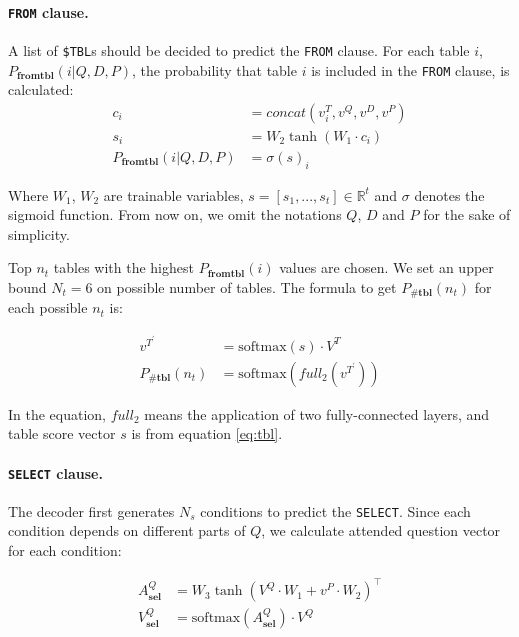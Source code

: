 \documentclass[11pt,a4paper]{article}
\begin{document}
\paragraph{\texttt{FROM} clause.} A list of \texttt{\$TBL}s should be decided to predict the \texttt{FROM} clause. For each table $i$, $P_\textbf{fromtbl}(i | Q,D,P)$, the probability that table $i$ is included in the \texttt{FROM} clause, is calculated:
\begin{align}
c_i &= concat( v^T_i, v^Q, v^D, v^P ) \nonumber \\  
s_i &= W_2 \tanh( W_1 \cdot c_i )  \label{eq:tbl}  \\
P_\textbf{fromtbl}(i|Q,D,P) &=  \sigma ( s )_i \nonumber
\end{align} 

Where $W_1$, $W_2$ are trainable variables, $s=[s_1, ..., s_t] \in \mathbb{R}^t$ and $\sigma$ denotes the sigmoid function. From now on, we omit the notations $Q$, $D$ and $P$ for the sake of simplicity.

Top $n_t$ tables with the highest $P_\textbf{fromtbl}(i)$ values are chosen. We set an upper bound $N_t=6$ on possible number of tables. The formula to get $P_\textbf{\#tbl}(n_t)$ for each possible $n_t$ is:

\begin{equation}
\begin{aligned}
v^{T^\prime} &= \text{softmax}(s) \cdot V^T \\
P_\textbf{\#tbl}(n_t) &= \text{softmax}(full_2(v^{T^\prime}) )
\end{aligned}
\end{equation}

In the equation, $full_2$ means the application of two fully-connected layers, and table score vector $s$ is from equation \ref{eq:tbl}.

\paragraph{\texttt{SELECT} clause.}  The decoder first generates $N_s$ conditions to predict the \texttt{SELECT}. Since each condition depends on different parts of $Q$, we calculate attended question vector for each condition:

\begin{equation}
\begin{aligned}
A^Q_\textbf{sel}&=W_3\tanh(V^Q \cdot W_1 + v^P \cdot W_2 )^\intercal \\
V^Q_\textbf{sel} &= \text{softmax}(A^Q_\textbf{sel}) \cdot V^Q 
\end{aligned}
\label{eq:clatt}
\end{equation}
\end{document}
